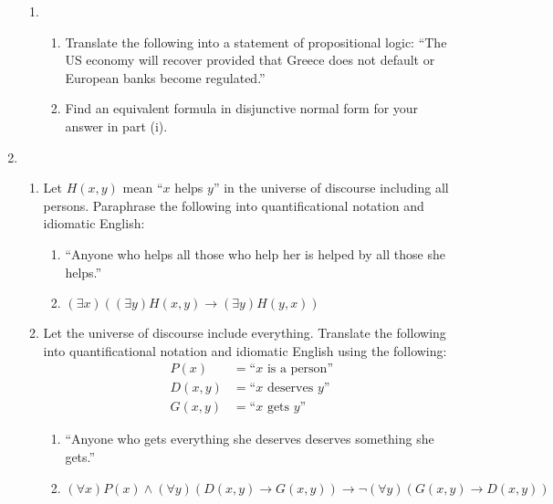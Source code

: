 \documentclass[12pt]{article}
\begin{document}
\begin{enumerate}
\begin{enumerate}
\item 
\begin{enumerate}
	\item Translate the following into a statement of propositional logic: ``The US economy will recover provided that Greece does not default or European banks become regulated.''
	
	\item Find an equivalent formula in disjunctive normal form for your answer in part (i).
\end{enumerate}




\end{enumerate}



\pagebreak

\item 
\begin{enumerate}

\item Let $H(x,y)$ mean ``$x$ helps $y$'' in the universe of discourse including all persons. Paraphrase the following into quantificational notation and idiomatic English:
\begin{enumerate}
	\item ``Anyone who helps all those who help her is helped by all those she helps.''
	
	\item $(\exists x)((\exists y) H(x, y) \rightarrow (\exists y) H(y, x))$
\end{enumerate}

\item Let the universe of discourse include everything. Translate the following into quantificational notation and idiomatic English using the following:
\begin{align*}
	P(x) &= \text{``$x$ is a person''} \\
	D(x, y) &= \text{``$x$ deserves $y$''} \\
	G(x, y) &= \text{``$x$ gets $y$''}
\end{align*}
\begin{enumerate}
	\item ``Anyone who gets everything she deserves deserves something she gets.''
	
	\item $(\forall x) P(x) \wedge (\forall y)(D(x, y) \rightarrow G(x, y)) \rightarrow \neg (\forall y)(G(x, y) \rightarrow D(x, y))$
\end{enumerate}
	


\end{enumerate}
\end{enumerate}
\end{document}

